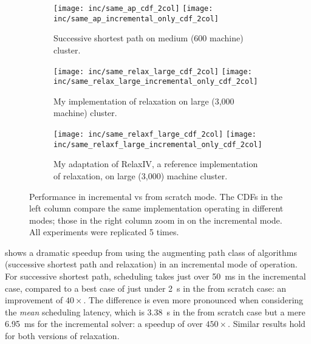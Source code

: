 \begin{figure}
    \begin{widepage}
        \begin{subfigure}[c]{\textwidth}
            \texttt{[image: inc/same\_ap\_cdf\_2col]}
            \texttt{[image: inc/same\_ap\_incremental\_only\_cdf\_2col]}
            \caption{Successive shortest path on medium (600 machine) cluster.}
            \label{fig:inc-same:ssp}
        \end{subfigure}
        \begin{subfigure}[c]{\textwidth}
            \texttt{[image: inc/same\_relax\_large\_cdf\_2col]}                        \texttt{[image: inc/same\_relax\_large\_incremental\_only\_cdf\_2col]}
            \caption{My implementation of relaxation on large (3,000 machine) cluster.}
            \label{fig:inc-same:relax-my}
        \end{subfigure}
        \begin{subfigure}[c]{\textwidth}
            \texttt{[image: inc/same\_relaxf\_large\_cdf\_2col]}
            \texttt{[image: inc/same\_relaxf\_large\_incremental\_only\_cdf\_2col]}
            \caption{My adaptation of RelaxIV, a reference implementation of relaxation, on large (3,000) machine cluster.}
            \label{fig:inc-same:relax-iv}
        \end{subfigure}
    \end{widepage}
    \caption[Performance in incremental vs from scratch mode]{Performance in incremental vs from scratch mode. The CDFs in the left column compare the same implementation operating in different modes; those in the right column zoom in on the incremental mode. All experiments were replicated 5 times.}
    \label{fig:inc-same}
\end{figure}

 shows a dramatic speedup from using the augmenting path class of algorithms (successive shortest path and relaxation) in an incremental mode of operation. For successive shortest path, scheduling takes just over \SI{50}{\milli\second} in the incremental case, compared to a best case of just under \SI{2}{\second} in the from scratch case: an improvement of $40\times$. The difference is even more pronounced when considering the \emph{mean} scheduling latency, which is \SI{3.38}{\second} in the from scratch case but a mere \SI{6.95}{\milli\second} for the incremental solver: a speedup of over $450\times$. Similar results hold for both versions of relaxation.

